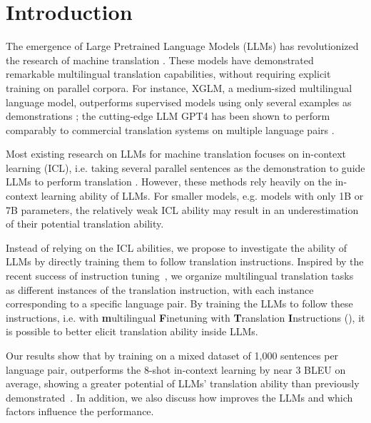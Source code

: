 \section{Introduction}

The emergence of Large Pretrained Language Models (LLMs) \citep{gpt3,chatgpt} has revolutionized the research of machine translation \citep{hendy2023good,garcia2023unreasonable}. These models have demonstrated remarkable multilingual translation capabilities, without requiring explicit training on parallel corpora. For instance, XGLM, a medium-sized multilingual language model, outperforms supervised models using only several examples as demonstrations \citep{lin-etal-2022-shot}; the cutting-edge LLM GPT4 has been shown to perform comparably to commercial translation systems on multiple language pairs \citep{jiao2023chatgpt}.

Most existing research on LLMs for machine translation focuses on in-context learning (ICL), i.e. taking several parallel sentences as the demonstration to guide LLMs to perform translation \citep{vilar-etal-2023-prompting,agrawal-etal-2023-context,hendy2023good,zhu2023multilingual}. However, these methods rely heavily on the in-context learning ability of LLMs. For smaller models, e.g. models with only 1B or 7B parameters, the relatively weak ICL ability may result in an underestimation of their potential translation ability. 


Instead of relying on the ICL abilities, we propose to investigate the ability of LLMs by directly training them to follow translation instructions.
Inspired by the recent success of instruction tuning~\citep{wei2022finetuned,chung2022scaling}, we organize multilingual translation tasks as different instances of the translation instruction, with each instance corresponding to a specific language pair. By training the LLMs to follow these instructions, i.e.  with \textbf{m}ultilingual \textbf{F}inetuning with \textbf{T}ranslation \textbf{I}nstructions (\methodend),
it is possible to better elicit translation ability inside LLMs. 


Our results show that by training on a mixed dataset of 1,000 sentences per language pair, \method outperforms the 8-shot in-context learning by near 3 BLEU on average, showing a greater potential of LLMs' translation ability than previously demonstrated~\citep{lin-etal-2022-shot}. In addition, we also discuss how \method improves the LLMs and which factors influence the performance.



